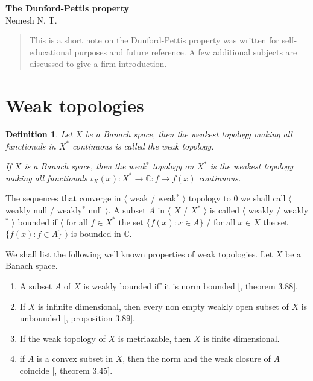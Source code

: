 \documentclass[12pt]{article}
\newtheorem{definition}[theorem]{Definition}
\begin{document}
\begin{center}

    \Large \textbf{The Dunford-Pettis property}\\[0.5cm]
    \small {Nemesh N. T.}\\[0.5cm]

\end{center}

\begin{abstract}
    This is a short note on the Dunford-Pettis property was written for
    self-educational purposes and future reference. A few additional subjects
    are discussed to give a firm introduction.
\end{abstract}

\section{Weak topologies}

\begin{definition} Let $X$ be a Banach space, then the weakest topology making
    all functionals in $X^*$ continuous is called the weak topology.

    If $X$ is a Banach space, then the weak${}^*$ topology on $X^*$ is the
    weakest topology making all functionals
    $\iota_X(x):X^*\to\mathbb{C}:f\mapsto f(x)$ continuous.
\end{definition}

The sequences that converge in $\langle$ weak / weak${}^*$ $\rangle$ topology to
$0$ we shall call $\langle$ weakly null / weakly${}^*$ null $\rangle$. A subset
$A$ in $\langle$ $X$ / $X^*$ $\rangle$ is called $\langle$ weakly / weakly${}^*$
$\rangle$ bounded if $\langle$ for all $f\in X^*$ the set $\{f(x):x\in A\}$ /
for all $x\in X$ the set $\{f(x):f\in A\}$ $\rangle$ is bounded in $\mathbb{C}$.

We shall list the following well known properties of weak topologies. Let $X$ be
a Banach space.

\begin{enumerate}[label = (\roman*)]

    \item A subset $A$ of $X$ is weakly bounded iff it is norm bounded
              [\cite{FabHabBanSpTh}, theorem 3.88].

    \item If $X$ is infinite dimensional, then every non empty weakly open
          subset of $X$ is unbounded [\cite{FabHabBanSpTh}, proposition 3.89].

    \item If the weak topology of $X$ is metriazable, then $X$ is finite
          dimensional.

    \item if $A$ is a convex subset in $X$, then the norm and the weak closure
          of $A$ coincide [\cite{FabHabBanSpTh}, theorem 3.45].

\end{enumerate}
\end{document}
